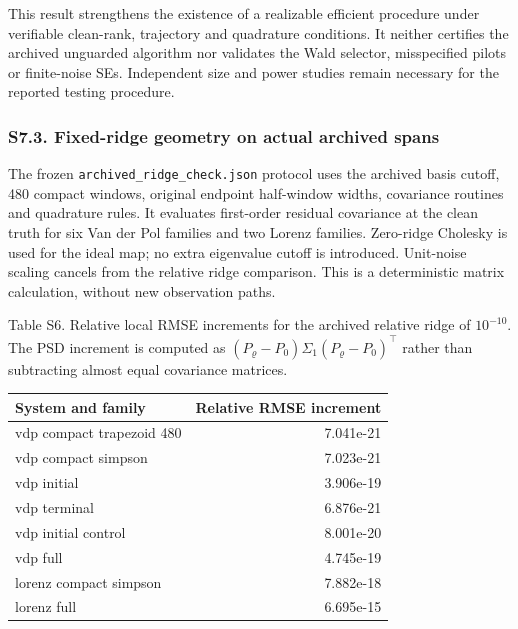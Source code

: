\documentclass[
  american,
  11pt,
]{article}
\begin{document}
This result strengthens the existence of a realizable efficient
procedure under verifiable clean-rank, trajectory and quadrature
conditions. It neither certifies the archived unguarded algorithm nor
validates the Wald selector, misspecified pilots or finite-noise SEs.
Independent size and power studies remain necessary for the reported
testing procedure.

\subsubsection{S7.3. Fixed-ridge geometry on actual archived
spans}\label{s7.3.-fixed-ridge-geometry-on-actual-archived-spans}

The frozen \texttt{archived\_ridge\_check.json} protocol uses the
archived basis cutoff, 480 compact windows, original endpoint
half-window widths, covariance routines and quadrature rules. It
evaluates first-order residual covariance at the clean truth for six Van
der Pol families and two Lorenz families. Zero-ridge Cholesky is used
for the ideal map; no extra eigenvalue cutoff is introduced. Unit-noise
scaling cancels from the relative ridge comparison. This is a
deterministic matrix calculation, without new observation paths.

\begin{center}
\begin{minipage}{\linewidth}
Table S6. Relative local RMSE increments for the archived relative ridge
of \(10^{-10}\). The PSD increment is computed as
\((P_\varrho-P_0)\Sigma_1(P_\varrho-P_0)^\top\) rather than subtracting
almost equal covariance matrices.

\small\setlength{\tabcolsep}{3pt}
\begin{tabular}{@{}lr@{}}
\toprule\noalign{}
System and family & Relative RMSE increment \\
\midrule\noalign{}
vdp compact trapezoid 480 & 7.041e-21 \\
vdp compact simpson & 7.023e-21 \\
vdp initial & 3.906e-19 \\
vdp terminal & 6.876e-21 \\
vdp initial control & 8.001e-20 \\
vdp full & 4.745e-19 \\
lorenz compact simpson & 7.882e-18 \\
lorenz full & 6.695e-15 \\
\bottomrule
\end{tabular}
\end{minipage}
\end{center}
\end{document}
